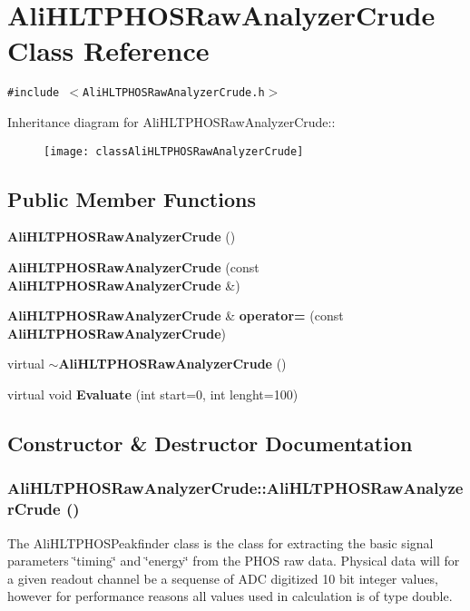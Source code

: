 \section{Ali\-HLTPHOSRaw\-Analyzer\-Crude Class Reference}
\label{classAliHLTPHOSRawAnalyzerCrude}
{\tt \#include $<$Ali\-HLTPHOSRaw\-Analyzer\-Crude.h$>$}

Inheritance diagram for Ali\-HLTPHOSRaw\-Analyzer\-Crude::\begin{figure}[H]
\begin{center}
\leavevmode
\texttt{[image: classAliHLTPHOSRawAnalyzerCrude]}
\end{center}
\end{figure}
\subsection*{Public Member Functions}
\begin{CompactItemize}
\item 
{\bf Ali\-HLTPHOSRaw\-Analyzer\-Crude} ()
\item 
{\bf Ali\-HLTPHOSRaw\-Analyzer\-Crude} (const {\bf Ali\-HLTPHOSRaw\-Analyzer\-Crude} \&)
\item 
{\bf Ali\-HLTPHOSRaw\-Analyzer\-Crude} \& {\bf operator=} (const {\bf Ali\-HLTPHOSRaw\-Analyzer\-Crude})
\item 
virtual {\bf $\sim$Ali\-HLTPHOSRaw\-Analyzer\-Crude} ()
\item 
virtual void {\bf Evaluate} (int start=0, int lenght=100)
\end{CompactItemize}


\subsection{Constructor \& Destructor Documentation}
\subsubsection{\setlength{\rightskip}{0pt plus 5cm}Ali\-HLTPHOSRaw\-Analyzer\-Crude::Ali\-HLTPHOSRaw\-Analyzer\-Crude ()}\label{classAliHLTPHOSRawAnalyzerCrude_a0}


The Ali\-HLTPHOSPeakfinder class is the class for extracting the basic signal parameters \char`\"{}timing\char`\"{} and \char`\"{}energy\char`\"{} from the PHOS raw data. Physical data will for a given readout channel be a sequense of ADC digitized 10 bit integer values, however for performance reasons all values used in calculation is of type double. 


